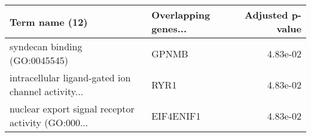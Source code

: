 \begin{tabular}{llr}
\toprule
                                    Term name (12) & Overlapping genes... &  Adjusted p-value \\
\midrule
                     syndecan binding (GO:0045545) &                GPNMB &          4.83e-02 \\
intracellular ligand-gated ion channel activity... &                 RYR1 &          4.83e-02 \\
nuclear export signal receptor activity (GO:000... &            EIF4ENIF1 &          4.83e-02 \\
\bottomrule
\end{tabular}
